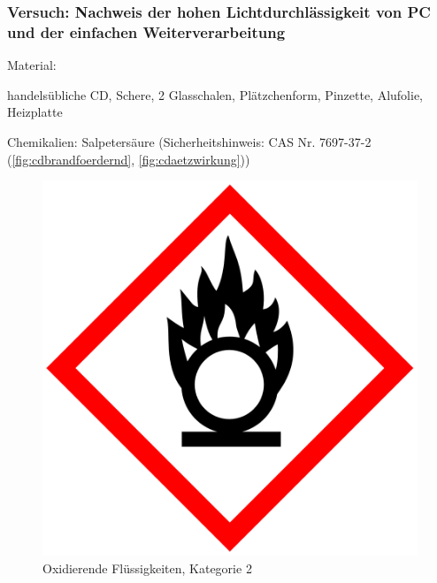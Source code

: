 \subsubsection{Versuch: Nachweis der hohen Lichtdurchlässigkeit von PC und der einfachen Weiterverarbeitung}

Material:
\begin{itemize*}
    \item handelsübliche CD, Schere, 2 Glasschalen, Plätzchenform, Pinzette, Alufolie, Heizplatte
    \item Chemikalien: Salpetersäure (Sicherheitshinweis: CAS Nr. 7697-37-2 (\autoref{fig:cdbrandfoerdernd}, \autoref{fig:cdaetzwirkung}))
\end{itemize*}

\begin{figure}[h]
    \begin{center}
        \begin{minipage}[t]{0.4\textwidth}
            \begin{center}
                \includegraphics[height=0.1\textheight]{Bilder/Optische_Datentraeger_Die_Compact_Disc/Material_Polycarbonat/cdbrandfoerdernd.png}
                \caption[Oxidierende Flüssigkeiten, Kategorie 2 \newline \url{https://upload.wikimedia.org/wikipedia/commons/e/e5/GHS-pictogram-rondflam.svg} (zuletzt aufgerufen am 19.09.2015)]{Oxidierende Flüssigkeiten, Kategorie 2}

\end{center}
\end{minipage}
\end{center}
\end{figure}
